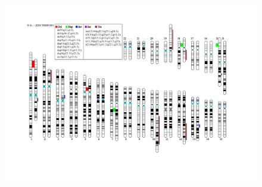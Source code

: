 \documentclass{article}
\begin{document}
\newpage

\begin{landscape}
	\begin{figure}
		\includegraphics[width=\linewidth]{figures/electronical_idiogram.pdf}
	\end{figure}
	

\end{landscape}
\end{document}
